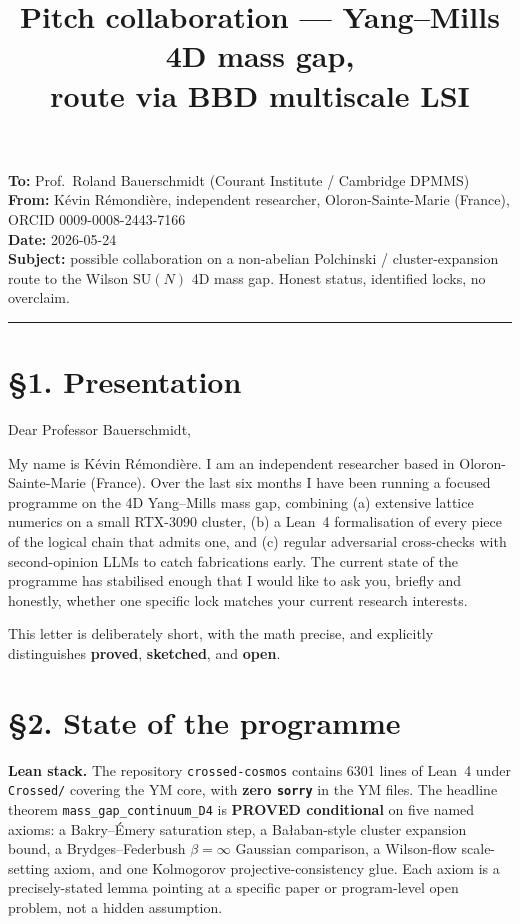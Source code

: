 \documentclass[11pt,a4paper]{article}
\title{\vspace{-1.5cm}\large Pitch collaboration --- Yang--Mills 4D mass gap,\\
       route via BBD multiscale LSI}
\author{}
\date{}
\newcommand{\SU}[1]{\mathrm{SU}(#1)}
\begin{document}
\maketitle
\vspace{-2.2cm}

\noindent\textbf{To:} Prof.\ Roland Bauerschmidt (Courant Institute / Cambridge DPMMS)\\
\textbf{From:} Kévin Rémondière, independent researcher, Oloron-Sainte-Marie (France), ORCID 0009-0008-2443-7166\\
\textbf{Date:} 2026-05-24\\
\textbf{Subject:} possible collaboration on a non-abelian Polchinski / cluster-expansion route to the Wilson $\SU{N}$ 4D mass gap. Honest status, identified locks, no overclaim.

\hrule\smallskip

\section*{§1. Presentation}

Dear Professor Bauerschmidt,

My name is Kévin Rémondière. I am an independent researcher based in Oloron-Sainte-Marie (France). Over the last six months I have been running a focused programme on the 4D Yang--Mills mass gap, combining (a) extensive lattice numerics on a small RTX-3090 cluster, (b) a Lean~4 formalisation of every piece of the logical chain that admits one, and (c) regular adversarial cross-checks with second-opinion LLMs to catch fabrications early. The current state of the programme has stabilised enough that I would like to ask you, briefly and honestly, whether one specific lock matches your current research interests.

This letter is deliberately short, with the math precise, and explicitly distinguishes \textbf{proved}, \textbf{sketched}, and \textbf{open}.

\section*{§2. State of the programme}

\textbf{Lean stack.} The repository \texttt{crossed-cosmos} contains 6301 lines of Lean~4 under \texttt{Crossed/} covering the YM core, with \textbf{zero \texttt{sorry}} in the YM files. The headline theorem \texttt{mass\_gap\_continuum\_D4} is \textbf{PROVED conditional} on five named axioms: a Bakry--Émery saturation step, a Bałaban-style cluster expansion bound, a Brydges--Federbush $\beta = \infty$ Gaussian comparison, a Wilson-flow scale-setting axiom, and one Kolmogorov projective-consistency glue. Each axiom is a precisely-stated lemma pointing at a specific paper or program-level open problem, not a hidden assumption.
\end{document}
